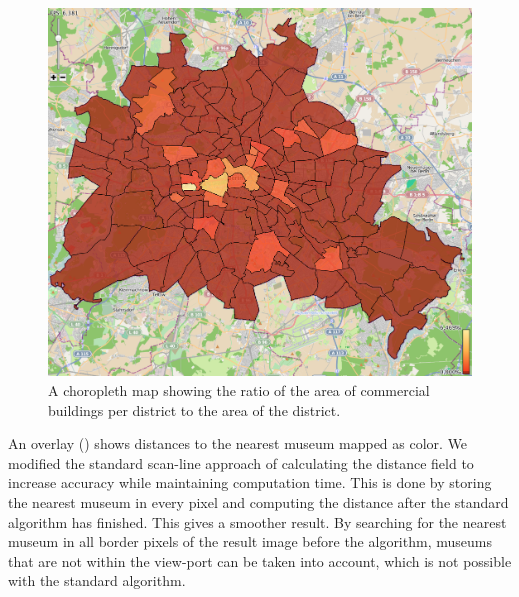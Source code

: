 \begin{figure}
        \centering
		\includegraphics[width=0.8\linewidth]{imgs/commercial}
        \caption{A choropleth map showing the ratio of the area of commercial buildings
        per district to the area of the district.}
		\label{fig:commercial}
\end{figure}

An overlay () shows distances to the nearest museum mapped as color.
We modified the standard scan-line approach of calculating the distance field to
increase accuracy while maintaining computation time. This is done by storing
the nearest museum in every pixel and computing the distance after the standard
algorithm has finished. This gives a smoother result. By searching for the nearest
museum in all border pixels of the result image before the algorithm, museums that
are not within the view-port can be taken into account, which is not possible with
the standard algorithm.

